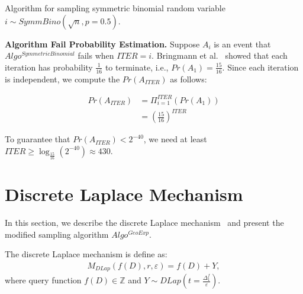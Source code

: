 \begin{algorithm}[tbh!]
{{            \\
            \\
            \\
            \\
            \\
        }}
    \caption{Algorithm for sampling symmetric binomial random variable $i\sim SymmBino\left(\sqrt{n} ,p=0.5\right) $.}
    \label{algo:SymmetricBinomialLargeN}
\end{algorithm}
\FloatBarrier

\textbf{Algorithm Fail Probability Estimation. }
Suppose $A_i$ is an event that $Algo^{SymmetricBinomial}$ fails when $ITER=i$.
Bringmann et al.~\cite{bringmann2014internal} showed that each iteration has probability $\frac{1}{16} $ to terminate, i.e., $Pr\left(A_1\right)=\frac{15}{16} $.
Since each iteration is independent, we compute the $Pr\left(A_{ITER}\right)$ as follows:

\begin{equation}
    \begin{split}
        Pr\left(A_{ITER}\right) &  =  \Pi _{i=1}^{ITER}\left(Pr\left(A_1\right) \right) \\
        &=\left(\frac{15}{16}\right)^{ITER}
    \end{split}
\end{equation}

To guarantee that $Pr\left(A_{ITER}\right)<2^{-40}$, we need at least $ITER\geq \log _\frac{15}{16}\left(2^{-40}\right)\approx 430$.

\section{Discrete Laplace Mechanism}
\label{sec:discreteLaplacemechanism}

In this section, we describe the discrete Laplace mechanism~\cite{chan2012privacy, ghosh2012universally,eigner2014differentially,canonne2020discrete} and present the modified sampling algorithm $Algo^{GeoExp}$.

The discrete Laplace mechanism is define as:
\begin{equation}
    \begin{split}
        M_{DLap}\left(f\left(D\right),r,\varepsilon\right)=f\left(D\right) +Y,
    \end{split}
\end{equation}
where query function $f\left(D\right)\in\mathbb{Z} $ and $Y\sim DLap\left(t=\frac{\Delta_1^{f}}{\varepsilon}\right) $.

